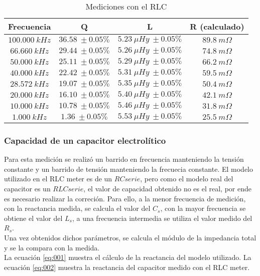 \documentclass[a4paper,10pt]{article}
\begin{document}
		\begin{table}[!htp]
			\centering
			\begin{tabular}{|c|c|c|c|}
				\hline
				Frecuencia & Q & L  & R (calculado) \\
				\hline
				$100.000~kHz$& $36.58~\pm0.05\%$ & $5.23~\mu Hy~\pm0.05\%$ &
				$ 89.8~m\Omega$ \\
				\hline
				$66.660~kHz$& $29.44~\pm0.05\%$ & $5.26~\mu Hy~\pm0.05\%$ &
				$ 74.8~m\Omega$ \\
				\hline
				$50.000~kHz$& $25.11~\pm0.05\%$ & $5.29~\mu Hy~\pm0.05\%$ &
				$ 66.2~m\Omega$ \\
				\hline  
				$40.000~kHz$& $22.42~\pm0.05\%$ & $5.31~\mu Hy~\pm0.05\%$ &
				$ 59.5~m\Omega$ \\
				\hline  										
				$28.572~kHz$& $19.07~\pm0.05\%$ & $5.35~\mu Hy~\pm0.05\%$ &
				$ 50.4~m\Omega$ \\
				\hline
				$20.000~kHz$& $16.10~\pm0.05\%$ & $5.40~\mu Hy~\pm0.05\%$ &
				$ 42.1~m\Omega$ \\
				\hline  
				$10.000~kHz$& $10.78~\pm0.05\%$ & $5.46~\mu Hy~\pm0.05\%$ &
				$ 31.8~m\Omega$ \\
				\hline 										
				$1.000~kHz$& $1.36~\pm0.05\%$ & $5.53~\mu Hy~\pm0.05\%$ &
				$ 25.5~m\Omega$ \\
				\hline 	  
			\end{tabular}
			\caption{Mediciones con el RLC} \label{tabRLCbobina}
		\end{table}
				
		\subsubsection{Capacidad de un capacitor electrol\'itico}	
		\indent Para esta medición se realizó un barrido en frecuencia 
		manteniendo la tensión constante y un barrido de tensión manteniendo la
		frecuecia constante. El modelo utilizado en el RLC meter es de un $RC 
		serie$, pero como el modelo real del capacitor es un $RLC serie$, el 
		valor de capacidad obtenido no es el real, por ende es necesario 
		realizar la correción. Para ello, a la menor frecuencia de medición, con
		la reactancia medida, se calcula el valor del $C_s$, con la mayor 
		frecuencia se obtiene el valor del $L_s$, a una frecuencia intermedia se
		utiliza el valor medido del $R_s$. \\
		\indent Una vez obtenidos dichos parámetros, se calcula el módulo de la
		impedancia total y se la compara con la medida. \\
		\indent La ecuación \ref{eq:001} muestra el cálculo de la reactancia del
		modelo utilizado. La ecuación \ref{eq:002} muestra la reactancia del 
		capacitor medido con el RLC meter.
		
\end{document}
